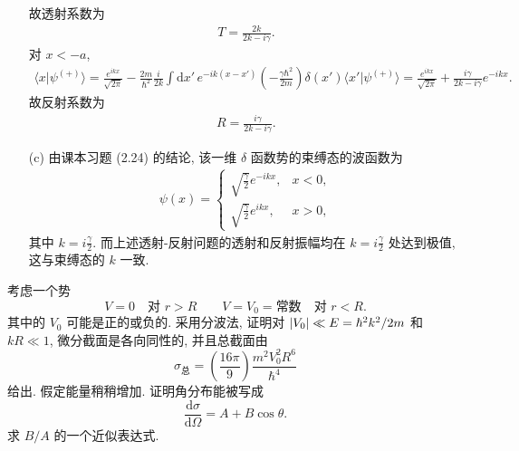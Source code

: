 \documentclass{assignment}
\begin{document}
\begin{sol}
\begin{itemize}
        故透射系数为
        \begin{align}
            T=\frac{2k}{2k-i\gamma}.
        \end{align}
        对 $x<-a$,
        \begin{align}
            \langle x\vert\psi^{(+)}\rangle=\frac{e^{ikx}}{\sqrt{2\pi}}-\frac{2m}{\hbar^2}\frac{i}{2k}\int\mathrm{d}x'\,e^{-ik(x-x')}\left(-\frac{\gamma\hbar^2}{2m}\right)\delta(x')\langle x'\vert\psi^{(+)}\rangle=\frac{e^{ikx}}{\sqrt{2\pi}}+\frac{i\gamma}{2k-i\gamma}e^{-ikx}.
        \end{align}
        故反射系数为
        \begin{align}
            R=\frac{i\gamma}{2k-i\gamma}.
        \end{align}
        \item[(c)] 由课本习题 (2.24) 的结论, 该一维 $\delta$ 函数势的束缚态的波函数为
        \begin{align}
            \psi(x)=\left\{\begin{array}{ll}
                \sqrt{\frac{\gamma}{2}}e^{-ikx},&x<0,\\
                \sqrt{\frac{\gamma}{2}}e^{ikx},&x>0,
            \end{array}\right.
        \end{align}
        其中 $k=i\frac{\gamma}{2}$. 而上述透射-反射问题的透射和反射振幅均在 $k=i\frac{\gamma}{2}$ 处达到极值, 这与束缚态的 $k$ 一致.
    \end{itemize}
\end{sol}

\begin{prob}[课本习题 6.4]
    考虑一个势
    \[
        V=0\quad\text{对 }r>R\qquad V=V_0=\text{常数}\quad\text{对 }r<R.
    \]
    其中的 $V_0$ 可能是正的或负的. 采用分波法, 证明对 $\left\lvert V_0\right\rvert\ll E=\hbar^2k^2/2m$ 和 $kR\ll 1$, 微分截面是各向同性的, 并且总截面由
    \[
        \sigma_{\text{总}}=\left(\frac{16\pi}{9}\right)\frac{m^2V_0^2R^6}{\hbar^4}
    \]
    给出. 假定能量稍稍增加. 证明角分布能被写成
    \[
        \frac{\mathrm{d}\sigma}{\mathrm{d}\Omega}=A+B\cos\theta.
    \]
    求 $B/A$ 的一个近似表达式.
\end{prob}
\end{document}
